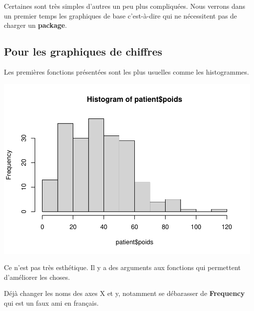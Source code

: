 \documentclass[
]{book}
\newenvironment{Shaded}{\begin{snugshade}}{\end{snugshade}}
\newcommand{\AttributeTok}[1]{\textcolor[rgb]{0.13,0.29,0.53}{#1}}
\newcommand{\FunctionTok}[1]{\textcolor[rgb]{0.13,0.29,0.53}{\textbf{#1}}}
\newcommand{\NormalTok}[1]{#1}
\newcommand{\SpecialCharTok}[1]{\textcolor[rgb]{0.81,0.36,0.00}{\textbf{#1}}}
\newcommand{\StringTok}[1]{\textcolor[rgb]{0.31,0.60,0.02}{#1}}
\begin{document}
Certaines sont très simples d'autres un peu plus compliquées. Nous verrons dans
un premier temps les graphiques de base c'est-à-dire qui ne nécessitent pas de
charger un \textbf{package}.

\hypertarget{pour-les-graphiques-de-chiffres}{%
\subsection{Pour les graphiques de chiffres}\label{pour-les-graphiques-de-chiffres}}

Les premières fonctions présentées sont les plus usuelles comme les histogrammes.

\begin{Shaded}
\end{Shaded}

\includegraphics{_main_files/figure-latex/poids1-1.pdf}

Ce n'est pas très esthétique. Il y a des arguments aux fonctions qui permettent
d'améliorer les choses.

Déjà changer les noms des axes X et y, notamment se débarasser de \textbf{Frequency}
qui est un faux ami en français.

\begin{Shaded}
\end{Shaded}
\end{document}
